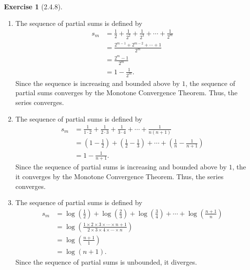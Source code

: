 \documentclass{amsart}
\theoremstyle{definition}
\newtheorem{exercise}{Exercise}
\begin{document}
\begin{exercise}[2.4.8]
  \begin{enumerate}[label={(\alph*)}]
    \item The sequence of partial sums is defined by
      \begin{align*}
        s_m &= \frac{1}{2} + \frac{1}{2^2} + \frac{1}{2^3} + \cdots +
        \frac{1}{2^m} \\
        &= \frac{2^{m-1} + 2^{m-2} + \cdots + 1}{2^m} \\
        &= \frac{2^m - 1}{2^m} \\
        &= 1 - \frac{1}{2^m}.
      \end{align*}
      Since the sequence is increasing and bounded above
      by $1$, the sequence of partial sums converges by the Monotone Convergence
      Theorem. Thus, the series converges.
    \item The sequence of partial sums is defined by
      \begin{align*}
        s_m &= \frac{1}{1 \cdot 2} + \frac{1}{2 \cdot 3} + \frac{1}{3 \cdot 4} +
        \cdots + \frac{1}{n (n + 1)} \\
        &= \left(1 - \frac{1}{2}\right) + \left(\frac{1}{2} - \frac{1}{3}\right)
        + \cdots + \left(\frac{1}{n} - \frac{1}{n + 1}\right) \\
        &= 1 - \frac{1}{n + 1}.
      \end{align*}
      Since the sequence of partial sums is increasing and bounded above by $1$,
      the it converges by the Monotone Convergence Theorem. Thus, the series
      converges.
    \item The sequence of partial sums is defined by
      \begin{align*}
        s_m &= \log\left(\frac{1}{2}\right) + \log\left(\frac{2}{3}\right) +
        \log\left(\frac{3}{4}\right) + \cdots + \log\left(\frac{n+1}{n}\right)
        \\
        &= \log\left(\frac{1 \times 2 \times 3 \times \cdots \times n + 1}{2
        \times 3 \times 4 \times \cdots \times n}\right) \\
        &= \log\left(\frac{n + 1}{1}\right) \\
        &= \log(n+1).
      \end{align*}
      Since the sequence of partial sums is unbounded, it diverges.
  \end{enumerate}
\end{exercise}
\end{document}

